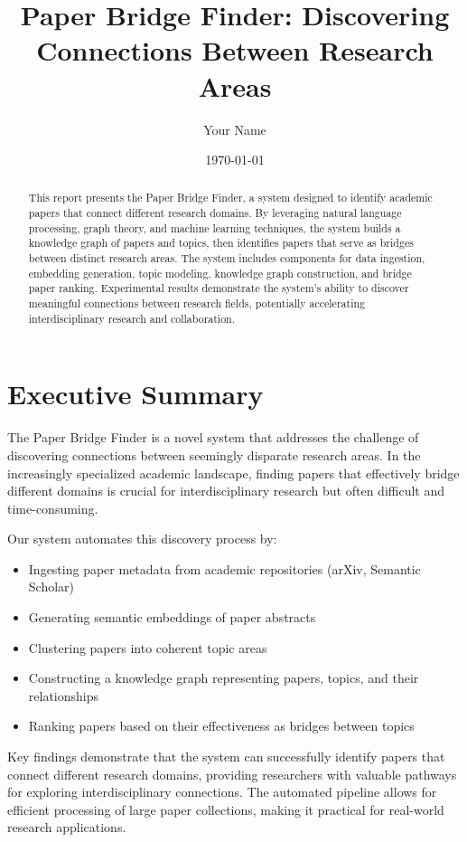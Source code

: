 \documentclass[11pt,a4paper]{article}
\title{Paper Bridge Finder: Discovering Connections Between Research Areas}
\author{Your Name}
\date{\today}
\begin{document}
\maketitle

\begin{abstract}
This report presents the Paper Bridge Finder, a system designed to identify academic papers that connect different research domains. By leveraging natural language processing, graph theory, and machine learning techniques, the system builds a knowledge graph of papers and topics, then identifies papers that serve as bridges between distinct research areas. The system includes components for data ingestion, embedding generation, topic modeling, knowledge graph construction, and bridge paper ranking. Experimental results demonstrate the system's ability to discover meaningful connections between research fields, potentially accelerating interdisciplinary research and collaboration.
\end{abstract}

\tableofcontents
\newpage

\section{Executive Summary}

The Paper Bridge Finder is a novel system that addresses the challenge of discovering connections between seemingly disparate research areas. In the increasingly specialized academic landscape, finding papers that effectively bridge different domains is crucial for interdisciplinary research but often difficult and time-consuming.

Our system automates this discovery process by:
\begin{itemize}
    \item Ingesting paper metadata from academic repositories (arXiv, Semantic Scholar)
    \item Generating semantic embeddings of paper abstracts
    \item Clustering papers into coherent topic areas
    \item Constructing a knowledge graph representing papers, topics, and their relationships
    \item Ranking papers based on their effectiveness as bridges between topics
\end{itemize}

Key findings demonstrate that the system can successfully identify papers that connect different research domains, providing researchers with valuable pathways for exploring interdisciplinary connections. The automated pipeline allows for efficient processing of large paper collections, making it practical for real-world research applications.
\end{document}
